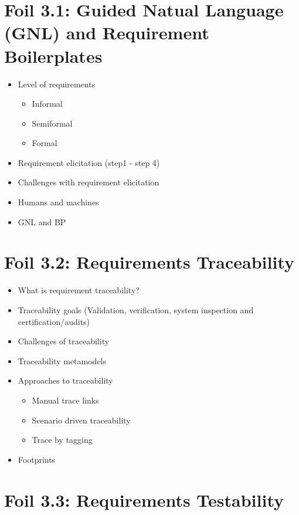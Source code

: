 
	\section{Foil 3.1: Guided Natual Language (GNL) and Requirement Boilerplates }
		\begin{itemize}
			\item Level of requirements
				\begin{itemize}
					\item Informal
					\item Semiformal
					\item Formal
				\end{itemize}
			\item Requirement elicitation (step1 - step 4)
			\item Challenges with requirement elicitation
			\item Humans and machines
			\item GNL and BP
		\end{itemize}

	\section{Foil 3.2: Requirements Traceability}
		\begin{itemize}
			\item What is requirement traceability?
			\item Traceability goals (Validation, verification, system inspection and certification/audits)
			\item Challenges of traceability
			\item Traceability metamodels
			\item Approaches to traceability
				\begin{itemize}
					\item Manual trace links
					\item Scenario driven traceability	
					\item Trace by tagging
				\end{itemize}
			\item Footprints	
		\end{itemize}

	\section{Foil 3.3: Requirements Testability}

